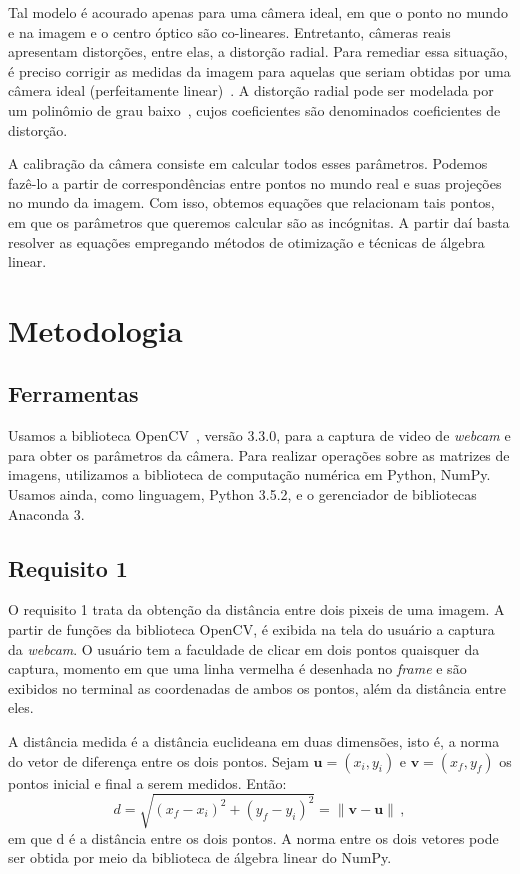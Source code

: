 \documentclass{bmvc2k}
\newcommand{\norm}[1]{\left\lVert#1\right\rVert}
\begin{document}
Tal modelo é acourado apenas para uma câmera ideal, em que o ponto no mundo e na imagem e o centro óptico são co-lineares. Entretanto, câmeras reais apresentam distorções, entre elas, a distorção radial. Para remediar essa situação, é preciso corrigir as medidas da imagem para aquelas que seriam obtidas por uma câmera ideal (perfeitamente linear)~\cite{Hartley:2003:MVG:861369}. A distorção radial pode ser modelada por um polinômio de grau baixo~\cite{Forsyth:2002:CVM:580035}, cujos coeficientes são denominados coeficientes de distorção.


A calibração da câmera consiste em calcular todos esses parâmetros. Podemos fazê-lo a partir de correspondências entre pontos no mundo real e suas projeções no mundo da imagem. Com isso, obtemos equações que relacionam tais pontos, em que os parâmetros que queremos calcular são as incógnitas. A partir daí basta resolver as equações empregando métodos de otimização e técnicas de álgebra linear.

\section{Metodologia}
\label{sec:met}
\subsection{Ferramentas}
Usamos a biblioteca OpenCV~\cite{opencv_library}, versão 3.3.0, para a captura de video de \textit{webcam} e para obter os parâmetros da câmera. Para realizar operações sobre as matrizes de imagens, utilizamos a biblioteca de computação numérica em Python, NumPy. Usamos ainda, como linguagem, Python 3.5.2, e o gerenciador de bibliotecas Anaconda 3.

\subsection{Requisito 1}
O requisito 1 trata da obtenção da distância entre dois pixeis de uma imagem. A partir de funções da biblioteca OpenCV, é exibida na tela do usuário a captura da \textit{webcam}. O usuário tem a faculdade de clicar em dois pontos quaisquer da captura, momento em que uma linha vermelha é desenhada no \textit{frame} e são exibidos no terminal as coordenadas de ambos os pontos, além da distância entre eles.

A distância medida é a distância euclideana em duas dimensões, isto é, a norma do vetor de diferença entre os dois pontos. Sejam $\bm{u}=(x_i, y_i)$ e $\bm{v}=(x_f, y_f)$ os pontos inicial e final a serem medidos. Então:
\begin{equation}
    d=\sqrt{(x_f-x_i)^2 + (y_f-y_i)^2} = \norm{\bm{v}-\bm{u}}\,,
\end{equation}
em que d é a distância entre os dois pontos. A norma entre os dois vetores pode ser obtida por meio da biblioteca de álgebra linear do NumPy.
\end{document}
